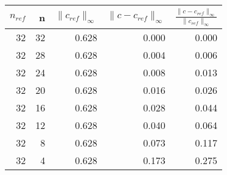 \begin{tabular}{rrrrr}
\toprule
$n_{ref}$ & n & $\| c_{ref} \|_{\infty}$ & $\| c-c_{ref} \|_{\infty}$ & $\frac{\| c-c_{ref} \|_{\infty}}{\| c_{ref} \|_{\infty}}$ \\
\midrule
32 & 32 & 0.628 & 0.000 & 0.000 \\
32 & 28 & 0.628 & 0.004 & 0.006 \\
32 & 24 & 0.628 & 0.008 & 0.013 \\
32 & 20 & 0.628 & 0.016 & 0.026 \\
32 & 16 & 0.628 & 0.028 & 0.044 \\
32 & 12 & 0.628 & 0.040 & 0.064 \\
32 & 8 & 0.628 & 0.073 & 0.117 \\
32 & 4 & 0.628 & 0.173 & 0.275 \\
\bottomrule
\end{tabular}
